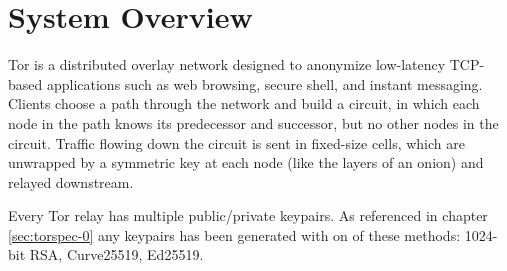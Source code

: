 
\chapter{System Overview}

Tor is a distributed overlay network designed to anonymize low-latency TCP-based applications such as web browsing, secure shell, and instant messaging. Clients choose a path through the network and build a circuit, in which each node in the path knows its predecessor and successor, but no other nodes in the circuit.  Traffic flowing down the circuit is sent in fixed-size cells, which are unwrapped by a symmetric key at each node (like the layers of an onion) and relayed downstream.

Every Tor relay has multiple public/private keypairs. As referenced in chapter \ref{sec:torspec-0} any keypairs has been generated with on of these methods: 1024-bit RSA, Curve25519, Ed25519.

